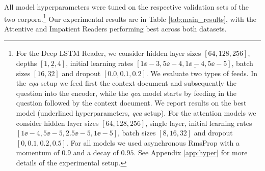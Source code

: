  All model hyperparameters were tuned on the respective validation sets of the
 two corpora.\footnote{For the Deep LSTM Reader, we consider hidden layer sizes
   ${[64,128,\underline{256}]}$, depths ${[1,\underline{2},4]}$, initial
   learning rates ${[1\ee{-}3,5\ee{-}4,\underline{1\ee{-}4},5\ee{-}5]}$, batch
   sizes ${[16,\underline{32}]}$ and dropout $[0.0,\underline{0.1},0.2]$.  We
   evaluate two types of feeds. In the \textit{cqa} setup we feed first the
   context document and subsequently the question into the encoder, while the
   \textit{qca} model starts by feeding in the question followed by the context
   document. We report results on the best model (underlined hyperparameters,
   \textit{qca} setup).  For the attention models we consider hidden layer sizes
   $[64,128,256]$, single layer,  initial learning rates
 $[1\ee{-}4,5\ee{-}5,2.5\ee{-}5,1\ee{-}5]$, batch sizes $[8,16,32]$ and dropout
 $[0,0.1,0.2,0.5]$. For all models we used asynchronous RmsProp
 \cite{Tieleman:2012:RMSPROP} with a momentum of $0.9$ and a decay of $0.95$.
 See Appendix \ref{app:hyper} for more details of the experimental setup.}
%
Our experimental results are in Table \ref{tab:main_results}, with the
Attentive and Impatient Readers performing best across both datasets.
